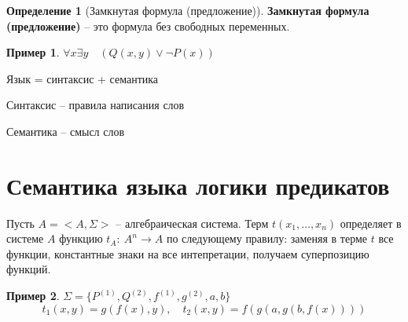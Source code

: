 \documentclass{report}
\theoremstyle{definition}
\newtheorem{definition}{Определение}[section]
\newtheorem{example}{Пример}
\begin{document}
\begin{definition}[Замкнутая формула (предложение)]
    \textbf{Замкнутая формула (предложение)} -- это формула без свободных переменных.
\end{definition}

\begin{example}
    $\forall x \exists y \quad (Q(x,y) \lor \lnot P(x))$
\end{example}

Язык = синтаксис + семантика

Синтаксис -- правила написания слов

Семантика -- смысл слов

\section{Семантика языка логики предикатов}

Пусть $A = <A,\Sigma>$ -- алгебраическая система. Терм $t(x_1,\ldots,x_n)$ определяет в системе $A$ функцию $t_A: \ A^n\rightarrow A$ по следующему правилу: заменяя в терме $t$ все функции, константные знаки на все интепретации, получаем суперпозицию функций.

\begin{example}
    $\Sigma = \{P^{(1)},Q^{(2)}, f^{(1)}, g^{(2)},a,b\}$
    \begin{equation*}
        t_1(x,y) = g(f(x), y), \quad t_2(x,y) = f(g(a,g(b,f(x))))
    \end{equation*}
\end{example}
\end{document}
